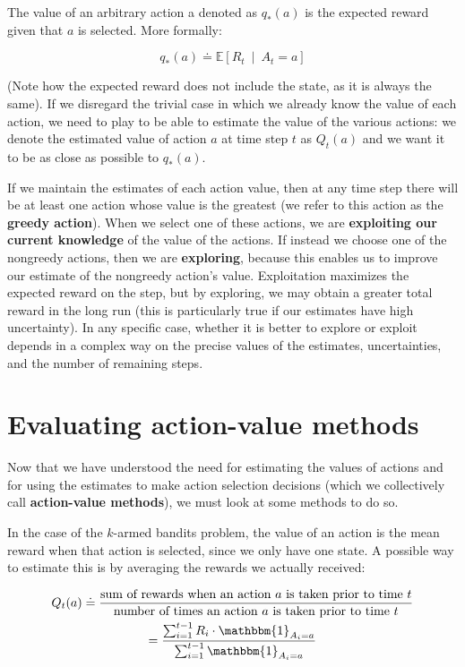 The value of an arbitrary action a denoted as $q_*(a)$ is the expected reward given that $a$ is selected. More formally:

\begin{equation*}
    q_*(a) \doteq \mathbb{E} \left[ R_t \  \middle\vert \  A_t = a \right]
\end{equation*}

(Note how the expected reward does not include the state, as it is always the same). If we disregard the trivial case in which we already know the value of each action, we need to play to be able to estimate the value of the various actions: we denote the estimated value of action $a$ at time step $t$ as $Q_t(a)$ and we want it to be as close as possible to $q_*(a)$.

If we maintain the estimates of each action value, then at any time step there will be at least one action whose value is the greatest (we refer to this action as the \textbf{greedy action}). When we select one of these actions, we are \textbf{exploiting our current knowledge} of the value of the actions. If instead we choose one of the nongreedy actions, then we are \textbf{exploring}, because this enables us to improve our estimate of the nongreedy action’s value. Exploitation maximizes the expected reward on the step, but by exploring, we may obtain a greater total reward in the long run (this is particularly true if our estimates have high uncertainty). In any specific case, whether it is better to explore or exploit depends in a complex way on the precise values of the estimates, uncertainties, and the number of remaining steps.

\section{Evaluating action-value methods}
Now that we have understood the need for estimating the values of actions and for using the estimates to make action selection decisions (which we collectively call \textbf{action-value methods}), we must look at some methods to do so.

In the case of the $k$-armed bandits problem, the value of an action is the mean reward when that action is selected, since we only have one state. A possible way to estimate this is by averaging the rewards we actually received:

\begin{gather}
    Q_t(a) \doteq \frac{\text{sum of rewards when an action } a \text{ is taken prior to time } t}{\text{number of times an action } a \text{ is taken prior to time } t}\nonumber\\
    = \frac{\sum_{i=1}^{t-1} R_i \cdot \mathbbm{1}_{A_i = a}}{\sum_{i=1}^{t-1} \mathbbm{1}_{A_i = a}}
    \label{eq:ch3-sampleaveragemethod}
\end{gather}

